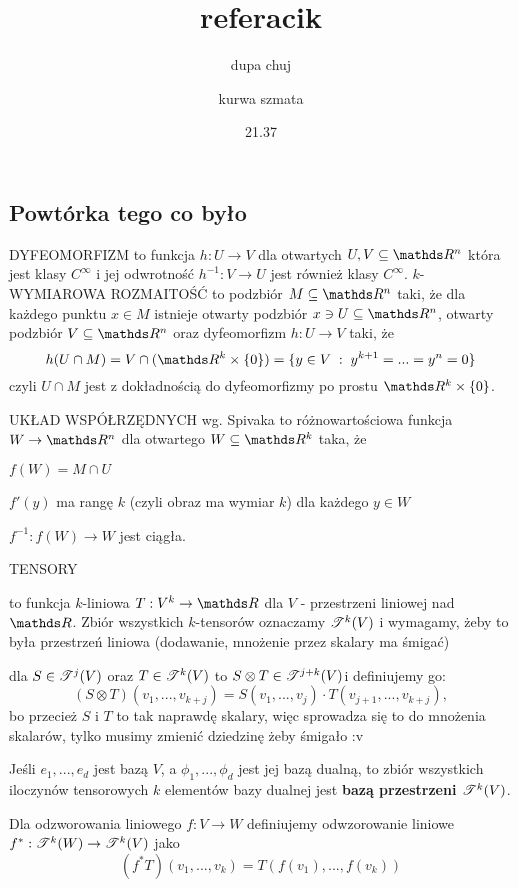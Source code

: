 \documentclass{article}
\title{referacik}
\author{dupa chuj \and kurwa szmata}
\date{21.37}
\newcommand{\T}{\rodz{T}}
\begin{document}
\maketitle
\thispagestyle{empty}

\tableofcontents

\subsection{Powtórka tego co było}

{\large\color{def}DYFEOMORFIZM} to funkcja $h:U\to V$ dla otwartych $U,V\subseteq\R^n$ która jest klasy $C^\infty$ i jej odwrotność $h^{-1}:V\to U$ jest również klasy $C^\infty$. {\large\color{def}$k$-WYMIAROWA ROZMAITOŚĆ} to podzbiór $M\subseteq\R^n$ taki, że dla każdego punktu $x\in M$ istnieje otwarty podzbiór $x\ni U\subseteq\R^n$, otwarty podzbiór $V \subseteq\R^n$ oraz dyfeomorfizm $h:U\to V$ taki, że
$$h(U\cap M)=V\cap (\R^k\times\{0\})=\{y\in V\;:\;y^{k+1}=...=y^n=0\}$$
czyli $U\cap M$ jest z dokładnością do dyfeomorfizmy po prostu $\R^k\times\{0\}$.
\medskip

{\large\color{def}UKŁAD WSPÓŁRZĘDNYCH} wg. Spivaka to różnowartościowa funkcja $W\to\R^n$ dla otwartego $W\subseteq\R^k$ taka, że

\point $f(W)=M\cap U$

\point $f'(y)$ ma rangę $k$ (czyli obraz ma wymiar $k$) dla każdego $y\in W$

\point $f^{-1}:f(W)\to W$ jest ciągła.
\medskip

{\large\color{def}TENSORY}
\begin{description}
    \item [$k$-tensor] to funkcja $k$-liniowa $T:V^k\to\R$ dla $V$ - przestrzeni liniowej nad $\R$. Zbiór wszystkich $k$-tensorów oznaczamy $\mathcal{T}^k(V)$ i wymagamy, żeby to była przestrzeń liniowa (dodawanie, mnożenie przez skalary ma śmigać)
    \item [Iloczyn tensorowy] dla $S\in\T^j(V)$ oraz $T\in\T^k(V)$ to $S\otimes T\in\T^{j+k}(V)$i definiujemy go: $$(S\otimes T)(v_1,...,v_{k+j})=S(v_1,...,v_j)\cdot T(v_{j+1},...,v_{k+j}),$$ bo przecież $S$ i $T$ to tak naprawdę skalary, więc sprowadza się to do mnożenia skalarów, tylko musimy zmienić dziedzinę żeby śmigało :v
    \item Jeśli $e_1,...,e_d$ jest bazą $V$, a $\phi_1,...,\phi_d$ jest jej bazą dualną, to zbiór wszystkich iloczynów tensorowych $k$ elementów bazy dualnej jest \textbf{bazą przestrzeni $\T^k(V)$}.
    \item Dla odzworowania liniowego $f:V\to W$ definiujemy odwzorowanie liniowe $f^*:\T^k(W)\to\T^k(V)$ jako $$(f^*T)(v_1,...,v_k)=T(f(v_1),...,f(v_k))$$
\end{description}
\medskip
\end{document}
